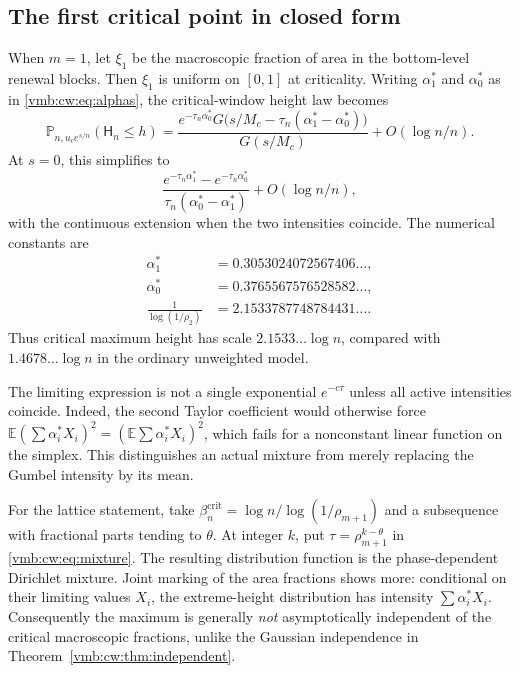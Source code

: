 \documentclass[11pt,a4paper]{article}
\numberwithin{equation}{section}
\theoremstyle{definition}\newtheorem{definition}[theorem]{Definition}
\theoremstyle{remark}\newtheorem{remark}[theorem]{Remark}
\newcommand{\E}{\mathbb E}
\newcommand{\Prob}{\mathbb P}
\begin{document}
\subsection{The first critical point in closed form}
When $m=1$, let $\xi_1$ be the macroscopic fraction of area in the bottom-level
renewal blocks. Then $\xi_1$ is uniform on $[0,1]$ at criticality. Writing
$\alpha_1^*$ and $\alpha_0^*$ as in \eqref{vmb:cw:eq:alphas}, the critical-window
height law becomes
\begin{equation}\label{vmb:cw:eq:mixtureone}
 \Prob_{n,u_c e^{s/n}}(\mathsf H_n\le h)
 =\frac{e^{-\tau_n\alpha_0^*}
       G\bigl(s/M_c-\tau_n(\alpha_1^*-\alpha_0^*)\bigr)}{G(s/M_c)}
  +O(\log n/n).
\end{equation}
At $s=0$, this simplifies to
\begin{equation}\label{vmb:cw:eq:twomix}
 \frac{e^{-\tau_n\alpha_1^*}-e^{-\tau_n\alpha_0^*}}
      {\tau_n(\alpha_0^*-\alpha_1^*)}+O(\log n/n),
\end{equation}
with the continuous extension when the two intensities coincide.
The numerical constants are
\begin{align*}
 \alpha_1^*&=0.3053024072567406\ldots,\\
 \alpha_0^*&=0.3765567576528582\ldots,\\
 \frac1{\log(1/\rho_2)}&=2.1533787748784431\ldots.
\end{align*}
Thus critical maximum height has scale $2.1533\ldots\log n$, compared with
$1.4678\ldots\log n$ in the ordinary unweighted model.

The limiting expression is not a single exponential $e^{-c\tau}$ unless
all active intensities coincide. Indeed, the second Taylor coefficient
would otherwise force
$\E(\sum\alpha_i^*X_i)^2=(\E\sum\alpha_i^*X_i)^2$, which fails for a
nonconstant linear function on the simplex. This distinguishes an actual
mixture from merely replacing the Gumbel intensity by its mean.

For the lattice statement, take
$\beta_n^{\mathrm{crit}}=\log n/\log(1/\rho_{m+1})$ and a subsequence with fractional
parts tending to $\theta$. At integer $k$, put
$\tau=\rho_{m+1}^{k-\theta}$ in \eqref{vmb:cw:eq:mixture}. The resulting distribution
function is the phase-dependent Dirichlet mixture. Joint marking of the
area fractions shows more: conditional on their limiting values $X_i$,
the extreme-height distribution has intensity $\sum\alpha_i^*X_i$.
Consequently the maximum is generally \emph{not} asymptotically independent
of the critical macroscopic fractions, unlike the Gaussian independence
in Theorem~\ref{vmb:cw:thm:independent}.
\end{document}
